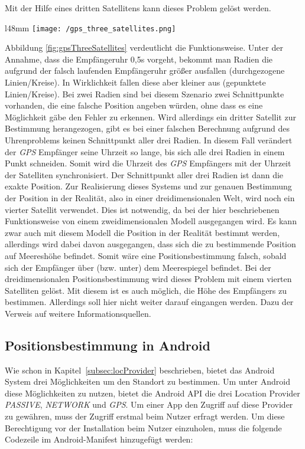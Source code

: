 Mit der Hilfe eines dritten Satellitens kann dieses Problem gelöst werden. 
\begin{wrapfigure}{l}{48mm}
	\centering
	\texttt{[image: /gps\_three\_satellites.png]}
	\caption[Lokalisierung: GPS 3 Satelliten]{GPS 3 Satellites}
	\label{fig:gpsThreeSatellites}
\end{wrapfigure}
Abbildung \ref{fig:gpsThreeSatellites} verdeutlicht die Funktionsweise. Unter der Annahme, dass die Empfängeruhr 0,5s vorgeht, bekommt man Radien die aufgrund der falsch laufenden Empfängeruhr größer ausfallen (durchgezogene Linien/Kreise). In Wirklichkeit fallen diese aber kleiner aus (gepunktete Linien/Kreise). Bei zwei Radien sind bei diesem Szenario zwei Schnittpunkte vorhanden, die eine falsche Position angeben würden, ohne dass es eine Möglichkeit gäbe den Fehler zu erkennen. Wird allerdings ein dritter Satellit zur Bestimmung herangezogen, gibt es bei einer falschen Berechnung aufgrund des Uhrenproblems keinen Schnittpunkt aller drei Radien. In diesem Fall verändert der \textit{GPS} Empfänger seine Uhrzeit so lange, bis sich alle drei Radien in einem Punkt schneiden. Somit wird die Uhrzeit des \textit{GPS} Empfängers mit der Uhrzeit der Satelliten synchronisiert. Der Schnittpunkt aller drei Radien ist dann die exakte Position.
Zur Realisierung dieses Systems und zur genauen Bestimmung der Position in der Realität, also in einer dreidimensionalen Welt, wird noch ein vierter Satellit verwendet. Dies ist notwendig, da bei der hier beschriebenen Funktionsweise von einem zweidimensionalen Modell ausgegangen wird. Es kann zwar auch mit diesem Modell die Position in der Realität bestimmt werden, allerdings wird dabei davon ausgegangen, dass sich die zu bestimmende Position auf Meereshöhe befindet. Somit wäre eine Positionsbestimmung falsch, sobald sich der Empfänger über (bzw. unter) dem Meerespiegel befindet.
Bei der dreidimensionalen Positionsbestimmung wird dieses Problem mit einem vierten Satelliten gelöst. Mit diesem ist es auch möglich, die Höhe des Empfängers zu bestimmen. Allerdings soll hier nicht weiter darauf eingangen werden. Dazu der Verweis auf weitere Informationsquellen.

\subsection{Positionsbestimmung in Android}\label{subsec:posInAndroid}

Wie schon in Kapitel~\ref{subsec:locProvider} beschrieben, bietet das Android System drei Möglichkeiten um den Standort zu bestimmen. Um unter Android diese Möglichkeiten zu nutzen, bietet die Android API die drei Location Provider \textit{PASSIVE}, \textit{NETWORK} und \textit{GPS}.
Um einer App den Zugriff auf diese Provider zu gewähren, muss der Zugriff erstmal beim Nutzer erfragt werden. Um diese Berechtigung vor der Installation beim Nutzer einzuholen, muss die folgende Codezeile im Android-Manifest hinzugefügt werden:

